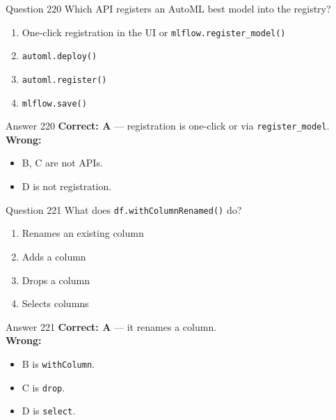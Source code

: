 \documentclass[aspectratio=169,11pt]{beamer}
\begin{document}
	\begin{frame}{Question 220}
		Which API registers an AutoML best model into the registry?
		\begin{enumerate}[label=\Alph*.]
			\item One-click registration in the UI or \texttt{mlflow.register\_model()}
			\item \texttt{automl.deploy()}
			\item \texttt{automl.register()}
			\item \texttt{mlflow.save()}
		\end{enumerate}
	\end{frame}
	\begin{frame}{Answer 220}
		\textbf{Correct: A} --- registration is one-click or via \texttt{register\_model}.\\
		\vspace{0.5em}
		\textbf{Wrong:}
		\begin{itemize}
			\item B, C are not APIs.
			\item D is not registration.
		\end{itemize}
	\end{frame}
	
	\begin{frame}{Question 221}
		What does \texttt{df.withColumnRenamed()} do?
		\begin{enumerate}[label=\Alph*.]
			\item Renames an existing column
			\item Adds a column
			\item Drops a column
			\item Selects columns
		\end{enumerate}
	\end{frame}
	\begin{frame}{Answer 221}
		\textbf{Correct: A} --- it renames a column.\\
		\vspace{0.5em}
		\textbf{Wrong:}
		\begin{itemize}
			\item B is \texttt{withColumn}.
			\item C is \texttt{drop}.
			\item D is \texttt{select}.
		\end{itemize}
	\end{frame}
	
\end{document}
